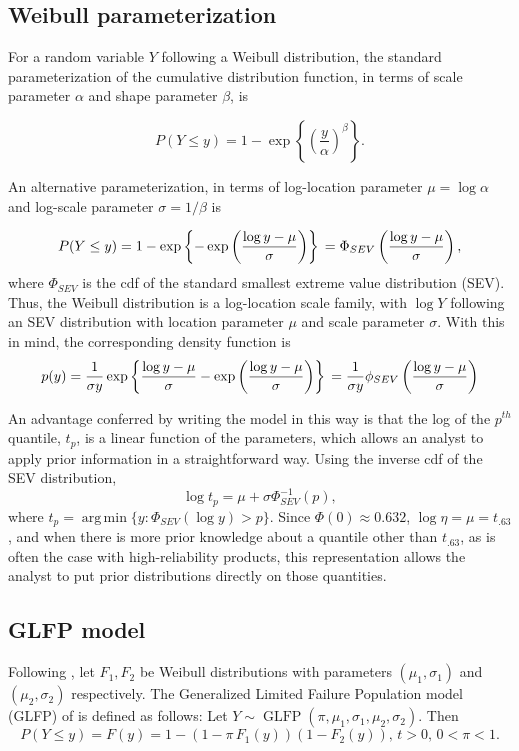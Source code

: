 \documentclass[12pt]{article}
\newcommand{\op}{\operatorname}
\DeclareMathOperator*{\argmin}{arg\,min}
\begin{document}
\subsection{Weibull parameterization}
\label{sec:Weibull parameterization}
For a random variable $Y$ following a Weibull distribution, the standard parameterization of the cumulative distribution function, in terms of scale parameter $\alpha$ and shape parameter $\beta$, is

$$ P(Y \le y) = 1 - \exp \left\{ \left( \frac{y}{\alpha} \right)^\beta \right\}. $$

An alternative parameterization, in terms of log-location parameter $\mu = \log \alpha$ and log-scale parameter $\sigma = 1/\beta$ is

\begin{equation} P(Y \le y) = 1 - \exp \left\{ -\exp \left( \frac{ \log y - \mu }{\sigma} \right) \right\}\\
= \Phi_{SEV}\left(\frac{\log y - \mu}{\sigma}\right),
\end{equation}
where $\Phi_{SEV}$ is the cdf of the standard smallest extreme value distribution (SEV). Thus, the Weibull distribution is a log-location scale family, with $\log Y$ following an SEV distribution with location parameter $\mu$ and scale parameter $\sigma$. With this in mind, the corresponding density function is
\begin{equation}
p(y) = \frac{1}{\sigma y}\exp\left\{\frac{\log y - \mu}{\sigma} - \exp \left( \frac{\log y - \mu}{\sigma} \right)\right\}\\
=\frac{1}{\sigma y} \phi_{SEV}\left(\frac{\log y - \mu}{\sigma}\right)
\end{equation}

An advantage conferred by writing the model in this way is that the log of the $p^{th}$ quantile, $t_p$, is a linear function of the parameters, which allows an analyst to apply prior information in a straightforward way.  Using the inverse cdf of the SEV distribution,
\begin{equation}
\log t_p = \mu + \sigma \Phi_{SEV}^{-1}(p),
\end{equation}
where $t_p = \argmin\{y:\Phi_{SEV}(\log y)>p\}$. Since $\Phi(0)\approx 0.632$, $\log{\eta} = \mu  =t_{.63}$, and when there is more prior knowledge about a quantile other than $t_{.63}$, as is often the case with high-reliability products,  this representation allows the analyst to put prior distributions directly on those quantities.


\subsection{GLFP model}
\label{subsec:GLFP model}
Following \cite{chan}, let $F_1,F_2$ be Weibull distributions with parameters $(\mu_1,\sigma_1)$ and $(\mu_2, \sigma_2)$ respectively.
The Generalized Limited Failure Population model (GLFP) of \citet{chan} is defined as follows: Let $Y \sim \op{GLFP}(\pi, \mu_1,\sigma_1,\mu_2,\sigma_2)$. Then
$$P(Y \le y) = F(y) = 1 - (1-\pi\, F_{1}(y))(1 - F_{2}(y)),\, t>0,\, 0 < \pi < 1.$$
\end{document}
